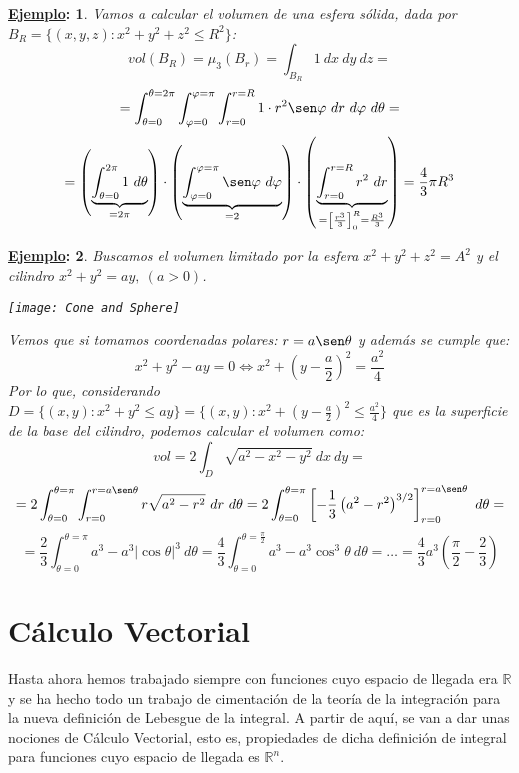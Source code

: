 \documentclass[10pt,a4paper,openright]{book}
\theoremstyle{break}
\newtheorem*{ej}{\underline{Ejemplo}:}
\newcommand{\dif}[1]{\ d#1}
\begin{document}
\begin{ej}
Vamos a calcular el volumen de una esfera sólida, dada por $B_R = \{\left(x, y, z\right) : x^2 + y^2 + z^2 \le R^2\}$:
$$vol \left(B_R\right) = \mu_3 \left(B_r\right) = \int_{B_R} 1 \dif{x} \dif{y} \dif{z}=$$
$$= \int_{\theta = 0}^{\theta = 2\pi }\int_{\varphi = 0}^{\varphi = \pi} \int_{r = 0}^{r = R} 1 \cdot r^2 \sen \varphi \dif{r} \dif{\varphi } \dif{\theta} = $$
$$= \left(\underbrace{\int_{\theta = 0}^{2\pi }1 \dif{\theta }}_{= 2\pi} \right) \cdot \left(\underbrace{\int_{\varphi = 0}^{\varphi = \pi} \sen \varphi \dif{\varphi }}_{= 2}\right) \cdot \left(\underbrace{\int_{r = 0}^{r = R} r^2 \dif{r}}_{= \left[\frac{r^3}{3}\right]_0^R = \frac{R^3}{3}}\right) = \frac{4}{3} \pi R^3$$
\end{ej}

\begin{ej}
Buscamos el volumen limitado por la esfera $x^2 + y^2 + z^2 = A^2$ y el cilindro $x^2 + y^2 = ay,\ \left(a > 0\right)$.

\begin{center}
\texttt{[image: Cone and Sphere]}
\end{center}

Vemos que si tomamos coordenadas polares: $r = a\sen \theta$ y además se cumple que:
$$x^2 + y^2 - ay = 0 \Leftrightarrow x^2 + \left(y - \frac{a}{2}\right)^2 = \frac{a^2}{4}$$
Por lo que, considerando $D = \{\left(x, y\right): x^2 + y^2 \le ay\} = \{\left(x, y\right): x^2 + \left(y - \frac{a}{2}\right)^2 \le \frac{a^2}{4}\}$ que es la superficie de la base del cilindro, podemos calcular el volumen como: 
$$vol = 2 \int_{D} \sqrt{a^2 - x^2 - y^2} \dif{x} \dif{y} = $$
$$= 2 \int_{\theta = 0}^{\theta = \pi} \int_{r = 0}^{r = a\sen \theta } r \sqrt{a^2 - r^2} \dif{r} \dif{\theta} = 2 \int_{\theta = 0}^{\theta = \pi} \left[-\frac{1}{3} \left(a^2 - r^2 \right)^{3/2}\right]_{r = 0}^{r = a\sen \theta }\dif{\theta} = $$
$$= \frac{2}{3} \int_{\theta = 0}^{\theta = \pi} a^3 - a^3 \lvert \cos \theta  \rvert^3 \dif{\theta } = \frac{4}{3} \int_{\theta = 0}^{\theta = \frac{\pi}{2}} a^3 - a^3 \cos^3 \theta \dif{\theta } = \ldots = \boxed{\frac{4}{3}a^3 \left(\frac{\pi}{2} - \frac{2}{3}\right)} $$
\end{ej}

\chapter{Cálculo Vectorial}
Hasta ahora hemos trabajado siempre con funciones cuyo espacio de llegada era $\mathbb{R}$ y se ha hecho todo un trabajo de cimentación de la teoría de la integración para la nueva definición de Lebesgue de la integral. A partir de aquí, se van a dar unas nociones de Cálculo Vectorial, esto es, propiedades de dicha definición de integral para funciones cuyo espacio de llegada es $\mathbb{R}^n$.
\end{document}
